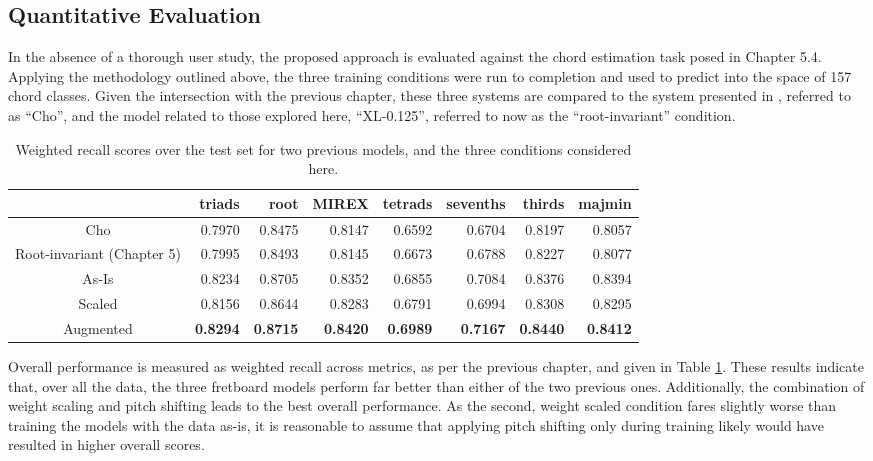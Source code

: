 \subsection{Quantitative Evaluation}
\label{subsec:evaluation}

In the absence of a thorough user study, the proposed approach is evaluated against the chord estimation task posed in Chapter 5.4.
Applying the methodology outlined above, the three training conditions were run to completion and used to predict into the space of 157 chord classes.
Given the intersection with the previous chapter, these three systems are compared to the system presented in \cite{Cho2014Improved}, referred to as ``Cho'', and the model related to those explored here, ``XL-0.125'', referred to now as the ``root-invariant'' condition.

\begin{table}[t]
\begin{center}
\scriptsize
\caption{Weighted recall scores over the test set for two previous models, and the three conditions considered here.}
\label{tab:test_micro}
\begin{tabular}{c|rrrrrrr}

\hline
 & triads &   root &   MIREX &   tetrads &   sevenths &   thirds &   majmin \\
\hline
Cho & 0.7970 & 0.8475 & 0.8147 & 0.6592 & 0.6704 & 0.8197 & 0.8057 \\
\hline
Root-invariant (Chapter 5)  & 0.7995 & 0.8493 & 0.8145 & 0.6673 & 0.6788 & 0.8227 & 0.8077 \\
\hline
As-Is     & 0.8234 & 0.8705 & 0.8352 & 0.6855 & 0.7084 & 0.8376 & 0.8394 \\
Scaled    & 0.8156 & 0.8644 & 0.8283 & 0.6791 & 0.6994 & 0.8308 & 0.8295 \\
Augmented & \textbf{0.8294} & \textbf{0.8715} & \textbf{0.8420} & \textbf{0.6989} & \textbf{0.7167} & \textbf{0.8440} & \textbf{0.8412} \\
\hline
\end{tabular}
\end{center}
\end{table}

Overall performance is measured as weighted recall across metrics, as per the previous chapter, and given in Table \ref{tab:test_micro}.
These results indicate that, over all the data, the three fretboard models perform far better than either of the two previous ones.
Additionally, the combination of weight scaling and pitch shifting leads to the best overall performance.
As the second, weight scaled condition fares slightly worse than training the models with the data as-is, it is reasonable to assume that applying pitch shifting only during training likely would have resulted in higher overall scores.


